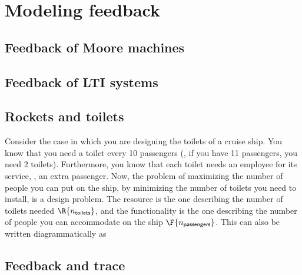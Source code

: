 
\section{Modeling feedback}
\label{sec:modeling-feedback}


\subsection{Feedback of Moore machines}


\subsection{Feedback of LTI systems}


\subsection{Rockets and toilets}

Consider the case in which you are designing the toilets of a cruise ship.
You know that you need a toilet every 10 passengers (\ie, if you have 11 passengers, you need 2 toilets).
Furthermore, you know that each toilet needs an employee for its service, \ie, an extra passenger.
Now, the problem of maximizing the number of people you can put on the ship, by minimizing the number of toilets you need to install, is a design problem.
The resource  is the one describing the number of toilets needed $\R{n_\mathsf{toilets}}$, and the functionality  is the one describing the number of people you can accommodate on the ship $\F{n_\mathsf{passengers}}$.
This can also be written diagrammatically as


\subsection{Feedback and trace}


